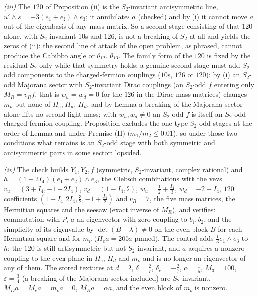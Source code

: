 \emph{(iii)} The $120$ of Proposition (ii) is the $S_{2}$-invariant antisymmetric line, $u'\wedge s = -3(e_{1} + e_{2})\wedge e_{3}$; it annihilates $a$ (checked) and by (i) it cannot move $a$ out of the eigenbasis of any mass matrix. So a second stage consisting of that $120$ alone, with $S_{2}$-invariant $10$s and $126$, is not a breaking of $S_{2}$ at all and yields the zeros of (ii): the second line of attack of the open problem, as phrased, cannot produce the Cabibbo angle or $\theta_{12}$, $\theta_{13}$. The family form of the $120$ is fixed by the residual $S_{2}$ only while that symmetry holds; a genuine second stage must add $S_{2}$-odd components to the charged-fermion couplings ($10$s, $126$ or $120$): by (i) an $S_{2}$-odd Majorana sector with $S_{2}$-invariant Dirac couplings (an $S_{2}$-odd $f$ entering only $M_{R} = v_{R}f$, that is $w_{u} = w_{d} = 0$ for the $126$ in the Dirac mass matrices) changes $m_{\nu}$ but none of $H_{e}$, $H_{u}$, $H_{d}$, and by Lemma  a breaking of the Majorana sector alone lifts no second light mass; with $w_{u}, w_{d} \neq 0$ an $S_{2}$-odd $f$ is itself an $S_{2}$-odd charged-fermion coupling. Proposition  excludes the one-type $S_{2}$-odd stages at the order of Lemma  and under Premise (H) ($m_{1}/m_{2} \le 0.01$), so under those two conditions what remains is an $S_{2}$-odd stage with both symmetric and antisymmetric parts in some sector: lopsided.

\emph{(iv)} The check builds $Y_{1}, Y_{2}, f$ (symmetric, $S_{2}$-invariant, complex rational) and $h = (1 + 2I_{4})(e_{1} + e_{2})\wedge e_{3}$, the Clebsch combinations with the vevs $v_{u} = (3 + I_{4}, -1 + 2I_{4})$, $v_{d} = (1 - I_{4}, 2)$, $w_{u} = \tfrac12 + \tfrac{I_{4}}{3}$, $w_{d} = -2 + I_{4}$, $120$ coefficients $(1 + I_{4}, 2I_{4}, \tfrac32, -1 + \tfrac{I_{4}}{2})$ and $v_{R} = 7$, the five mass matrices, the Hermitian squares and the seesaw (exact inverse of $M_{R}$), and verifies: commutation with $P$, $a$ an eigenvector with zero coupling to $b_{1}, b_{2}$, and the simplicity of its eigenvalue by $\det(B - \lambda) \neq 0$ on the even block $B$ for each Hermitian square and for $m_{\nu}$ ($H_{e}a = 205a$ pinned). The control adds $\tfrac13 e_{1}\wedge e_{3}$ to $h$: the $120$ is still antisymmetric but not $S_{2}$-invariant, and $a$ acquires a nonzero coupling to the even plane in $H_{e}$, $H_{d}$ and $m_{\nu}$ and is no longer an eigenvector of any of them. The stored textures at $d = 2$, $\delta = \tfrac27$, $\delta_{c} = -\tfrac27$, $\alpha = \tfrac15$, $M_{3} = 100$, $\varepsilon = \tfrac34$ (a breaking of the Majorana sector included) are $S_{2}$-invariant, $M_{D}a = M_{e}a = m_{\nu}a = 0$, $M_{R}a = \alpha a$, and the even block of $m_{\nu}$ is nonzero.
